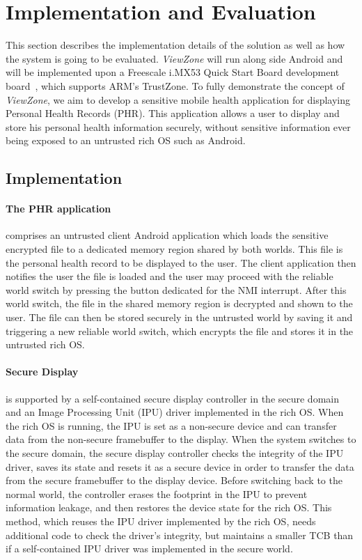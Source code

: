 
% 
% 
\section{Implementation and Evaluation}
\label{sec:evaluation}

This section describes the implementation details of the solution as well as how the system is going to be evaluated. \emph{ViewZone} will run along side Android and will be implemented upon a Freescale i.MX53 Quick Start Board development board~\cite{QSB_board}, which supports ARM's TrustZone. To fully demonstrate the concept of \emph{ViewZone}, we aim to develop a sensitive mobile health application for displaying Personal Health Records (PHR). This application allows a user to display and store his personal health information securely, without sensitive information ever being exposed to an untrusted rich OS such as Android.

\subsection{Implementation}

\paragraph{The \ac{PHR} application} comprises an untrusted client Android application which loads the sensitive encrypted file to a dedicated memory region shared by both worlds. This file is the personal health record to be displayed to the user. The client application then notifies the user the file is loaded and the user may proceed with the reliable world switch by pressing the button dedicated for the \ac{NMI} interrupt. After this world switch, the file in the shared memory region is decrypted and shown to the user. The file can then be stored securely in the untrusted world by saving it and triggering a new reliable world switch, which encrypts the file and stores it in the untrusted rich OS.

\paragraph{Secure Display} is supported by a self-contained secure display controller in the secure domain and an Image Processing Unit (IPU) driver implemented in the rich OS. When the rich OS is running, the IPU is set as a non-secure device and can transfer data from the non-secure framebuffer to the display. When the system switches to the secure domain, the secure display controller checks the integrity of the IPU driver, saves its state and resets it as a secure device in order to transfer the data from the secure framebuffer to the display device. Before switching back to the normal world, the controller erases the footprint in the IPU to prevent information leakage, and then restores the device state for the rich OS. This method, which reuses the IPU driver implemented by the rich OS, needs additional code to check the driver's integrity, but maintains a smaller TCB than if a self-contained IPU driver was implemented in the secure world.

